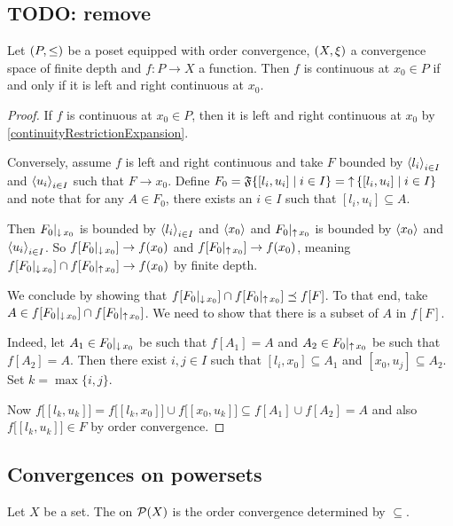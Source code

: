 \subsection{TODO: remove}
\begin{proposition} \label{leftRightConvergence}
Let $\sSet{P,\leq}$ be a poset equipped with order convergence, $\sSet{X,\xi}$ a convergence space of finite depth and $f: P\to X$ a function. Then $f$ is continuous at $x_0\in P$ \textup{if and only if} it is left and right continuous at $x_0$.
\end{proposition}
\begin{proof}
If $f$ is continuous at $x_0\in P$, then it is left and right continuous at $x_0$ by \ref{continuityRestrictionExpansion}.

Conversely, assume $f$ is left and right continuous and take $F$ bounded by $\left\langle l_i \right\rangle_{i\in I}$ and $\left\langle u_i \right\rangle_{i\in I}$ such that $F\to x_0$. Define $F_0 = \mathfrak{F}\setbuilder{[l_i, u_i]}{i\in I} = \upset \setbuilder{[l_i, u_i]}{i\in I}$ and note that for any $A\in F_0$, there exists an $i\in I$ such that $[l_i,u_i]\subseteq A$.


Then $F_0|_{\operatorname{\downarrow} x_0}$ is bounded by $\left\langle l_i \right\rangle_{i\in I}$ and $\left\langle x_0 \right\rangle$ and $F_0|_{\operatorname{\uparrow} x_0}$ is bounded by $\left\langle x_0 \right\rangle$ and $\left\langle u_i \right\rangle_{i\in I}$. So $f[F_0|_{\operatorname{\downarrow} x_0}] \to f(x_0)$ and $f[F_0|_{\operatorname{\uparrow} x_0}] \to f(x_0)$, meaning $f[F_0|_{\operatorname{\downarrow} x_0}]\cap f[F_0|_{\operatorname{\uparrow} x_0}] \to f(x_0)$ by finite depth.

We conclude by showing that $f[F_0|_{\operatorname{\downarrow} x_0}]\cap f[F_0|_{\operatorname{\uparrow} x_0}] \preceq f[F]$. To that end, take $A\in f[F_0|_{\operatorname{\downarrow} x_0}]\cap f[F_0|_{\operatorname{\uparrow} x_0}]$. We need to show that there is a subset of $A$ in $f[F]$.

Indeed, let $A_1\in F_0|_{\operatorname{\downarrow} x_0}$ be such that $f[A_1] = A$ and $A_2\in F_0|_{\operatorname{\uparrow} x_0}$ be such that $f[A_2] = A$.
Then there exist $i,j\in I$ such that $[l_i,x_0]\subseteq A_1$ and $[x_0, u_j]\subseteq A_2$. Set $k = \max\{i,j\}$.

Now $f\Big[[l_k,u_k]\Big] = f\Big[[l_k,x_0]\Big] \cup f\Big[[x_0,u_k]\Big]\subseteq f[A_1]\cup f[A_2] = A$ and also $f\Big[[l_k,u_k]\Big]\in F$ by order convergence.
\end{proof}


\subsection{Convergences on powersets}
\begin{definition}
Let $X$ be a set. The  on $\operatorname{\mathcal{P}}(X)$ is the order convergence determined by $\subseteq$.
\end{definition}

